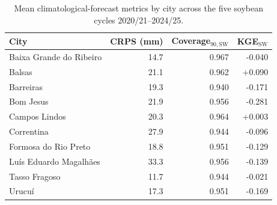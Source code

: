 \begin{table}[!t]
\centering
\caption{Mean climatological-forecast metrics by city across the five soybean cycles 2020/21--2024/25.}
\label{tab:forecast_by_city}
\begin{tabular}{lrrr}
\toprule
City & CRPS (mm) & Coverage$_{90,\mathrm{SW}}$ & KGE$_{\mathrm{SW}}$ \\
\midrule
Baixa Grande do Ribeiro & 14.7 & 0.967 & -0.040 \\
Balsas & 21.1 & 0.962 & +0.090 \\
Barreiras & 19.3 & 0.940 & -0.171 \\
Bom Jesus & 21.9 & 0.956 & -0.281 \\
Campos Lindos & 20.3 & 0.964 & +0.003 \\
Correntina & 27.9 & 0.944 & -0.096 \\
Formosa do Rio Preto & 18.8 & 0.951 & -0.129 \\
Lu\'is Eduardo Magalh\~aes & 33.3 & 0.956 & -0.139 \\
Tasso Fragoso & 11.7 & 0.944 & -0.021 \\
Urucu\'i & 17.3 & 0.951 & -0.169 \\
\bottomrule
\end{tabular}
\end{table}
